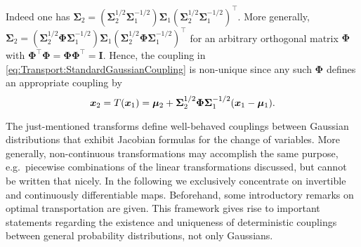 Indeed one has \(\bm{\Sigma}_2 = (\bm{\Sigma}_2^{1/2} \bm{\Sigma}_1^{-1/2}) \bm{\Sigma}_1 (\bm{\Sigma}_2^{1/2} \bm{\Sigma}_1^{-1/2})^\top\).
More generally, \(\bm{\Sigma}_2 = (\bm{\Sigma}_2^{1/2} \bm{\Phi} \bm{\Sigma}_1^{-1/2}) \bm{\Sigma}_1 (\bm{\Sigma}_2^{1/2} \bm{\Phi} \bm{\Sigma}_1^{-1/2})^\top\)
for an arbitrary orthogonal matrix \(\bm{\Phi}\) with \(\bm{\Phi}^\top \bm{\Phi} = \bm{\Phi} \bm{\Phi}^\top = \bm{I}\).
Hence, the coupling in \cref{eq:Transport:StandardGaussianCoupling} is non-unique since any such \(\bm{\Phi}\) defines an appropriate coupling by
\begin{equation} \label{eq:Transport:ArbitraryGaussianCoupling}
  \bm{x}_2 = T(\bm{x}_1) = \bm{\mu}_2 + \bm{\Sigma}_2^{1/2} \bm{\Phi} \bm{\Sigma}_1^{-1/2}(\bm{x}_1 - \bm{\mu}_1).
\end{equation}
\par %
The just-mentioned transforms define well-behaved couplings between Gaussian distributions that exhibit Jacobian formulas for the change of variables.
More generally, non-continuous transformations may accomplish the same purpose, e.g.\ piecewise combinations of the linear transformations discussed, but cannot be written that nicely.
In the following we exclusively concentrate on invertible and continuously differentiable maps.
Beforehand, some introductory remarks on optimal transportation are given.
This framework gives rise to important statements regarding the existence and uniqueness of deterministic couplings between general probability distributions, not only Gaussians.

